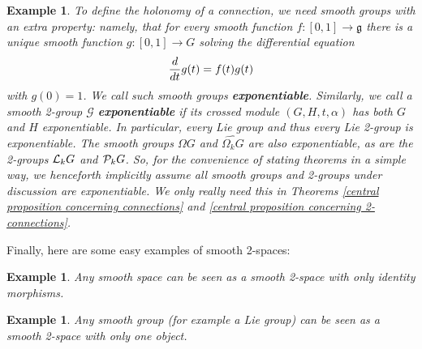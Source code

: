 \documentclass{article}
\newcommand{\maps}{\colon}
\newcommand{\g}{\mathfrak{g}}
\def\twogroup {\mathcal{G}}
\newtheorem{example}[theorem]{Example}
\newcommand{\et}{\hspace{-0.08in}{\bf .}\hspace{0.1in}}
\begin{document}
\begin{example}
{To define the holonomy of a connection, we need smooth groups with 
an extra property: namely, that for every smooth function 
$f \maps [0,1] \to \g$ there is a unique smooth function 
$g \maps [0,1] \to G$ solving the differential equation
\[       {d\over dt}g(t) = f(t)g(t)  \]
with $g(0) = 1$.  We call such smooth groups {\bf exponentiable}.
Similarly, we call a smooth 2-group $\twogroup$ {\bf exponentiable} 
if its crossed module $(G,H,t,\alpha)$ has both $G$ and $H$ 
exponentiable.  In particular, every Lie group and thus every
Lie 2-group is exponentiable.  The smooth groups $\Omega G$
and $\widehat{\Omega_k G}$ are also exponentiable, as are the 
2-groups ${\cal L}_k G$ and ${\cal P}_k G$.  So, for the convenience
of stating theorems in a simple way, {\it we henceforth implicitly
assume all smooth groups and 2-groups under discussion are exponentiable}.
We only really need this in Theorems \ref{central proposition concerning
connections} and \ref{central proposition concerning 2-connections}.
}\end{example}

Finally, here are some easy examples of smooth 2-spaces:

\begin{example} \et 
\label{2space.1}
{\rm 
Any smooth space can be seen as a 
smooth 2-space with only identity morphisms.
}
\end{example}

\begin{example} \et 
\label{2space.2} 
{\rm 
Any smooth group (for example a Lie group) can be seen as
a smooth 2-space with only one object.
}
\end{example}
\end{document}
